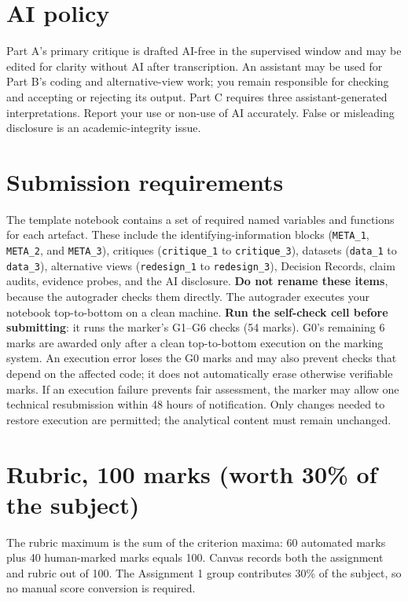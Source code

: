 \documentclass[11pt,a4paper]{article}
\newcommand{\labelbox}[1]{\colorbox{panel}{\texttt{\small #1}}}
\begin{document}
\section*{AI policy}

Part A's primary critique is drafted AI-free in the supervised window and may
be edited for clarity without AI after transcription. An assistant may be
used for Part B's coding and alternative-view work; you remain responsible for
checking and accepting or rejecting its output. Part C requires three
assistant-generated interpretations. Report your use or non-use of AI
accurately. False or misleading disclosure is an academic-integrity issue.

\section*{Submission requirements}

The template notebook contains a set of required named variables and functions
for each artefact. These include the identifying-information blocks
(\labelbox{META\_1}, \labelbox{META\_2}, and \labelbox{META\_3}), critiques
(\labelbox{critique\_1} to \labelbox{critique\_3}), datasets
(\labelbox{data\_1} to \labelbox{data\_3}), alternative views
(\labelbox{redesign\_1} to \labelbox{redesign\_3}), Decision Records, claim
audits, evidence probes, and the AI disclosure. \textbf{Do not rename these
items}, because the autograder checks them directly. The autograder executes
your notebook top-to-bottom on a clean machine. \textbf{Run the self-check cell
before submitting}: it runs the
marker's G1--G6 checks (54 marks). G0's remaining 6 marks are awarded only
after a clean top-to-bottom execution on the marking system. An execution
error loses the G0 marks and may also prevent checks that depend on the
affected code; it does not automatically erase otherwise verifiable marks.
If an execution failure prevents fair assessment, the marker may allow one
technical resubmission within 48 hours of notification. Only changes needed
to restore execution are permitted; the analytical content must remain
unchanged.

\section*{Rubric, 100 marks (worth 30\% of the subject)}

The rubric maximum is the sum of the criterion maxima: 60 automated marks plus
40 human-marked marks equals 100. Canvas records both the assignment and rubric
out of 100. The Assignment 1 group contributes 30\% of the subject, so no
manual score conversion is required.
\end{document}
